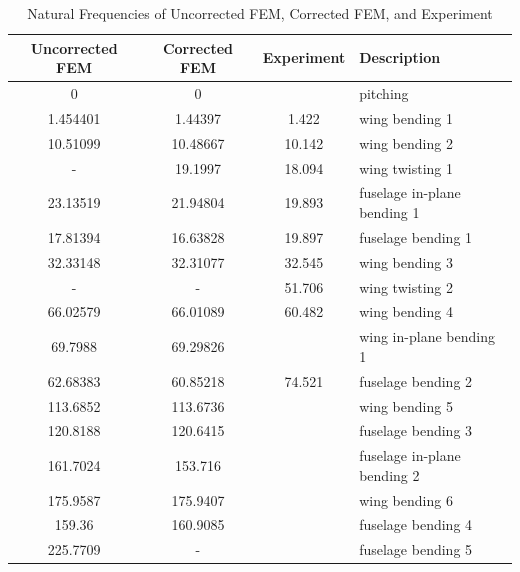 \begin{table}[h]
	\centering
	\caption{Natural Frequencies of Uncorrected FEM, Corrected FEM, and Experiment}
	\label{tab:gvtCompare}
	\begin{tabular}{cccl}
		\hline\hline
		Uncorrected FEM & Corrected FEM & Experiment & Description \\
		\hline
        0 & 0 &  & pitching \\
		1.454401 & 1.44397 & 1.422 & wing bending 1 \\
        10.51099 & 10.48667 & 10.142 & wing bending 2 \\
        - & 19.1997 & 18.094 & wing twisting 1 \\
        23.13519 & 21.94804 & 19.893 & fuselage in-plane bending 1 \\
        17.81394 & 16.63828 & 19.897 & fuselage bending 1 \\
        32.33148 & 32.31077 & 32.545 & wing bending 3 \\
        - & - & 51.706 & wing twisting 2 \\
        66.02579 & 66.01089 & 60.482 & wing bending 4 \\
        69.7988 & 69.29826 & & wing in-plane bending 1 \\
        62.68383 & 60.85218 & 74.521 & fuselage bending 2 \\
        113.6852 & 113.6736 & & wing bending 5 \\
        120.8188 & 120.6415 & & fuselage bending 3 \\
        161.7024 & 153.716 & & fuselage in-plane bending 2 \\
        175.9587 & 175.9407 & & wing bending 6 \\
        159.36 & 160.9085 & & fuselage bending 4 \\
        225.7709 & - & & fuselage bending 5 \\
		\hline\hline
	\end{tabular}
\end{table}